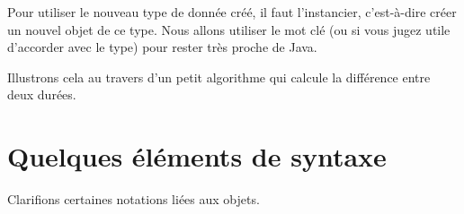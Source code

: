 		Pour utiliser le nouveau type de donnée créé,
		il faut l'instancier, c'est-à-dire créer un nouvel objet de ce type.
		Nous allons utiliser le mot clé 
		(ou  si vous jugez utile d'accorder avec le type)
		pour rester très proche de Java.
		
		Illustrons cela au travers d'un petit algorithme
		qui calcule la différence entre deux durées.
		
		\begin{algo}
		\end{algo}

\section{Quelques éléments de syntaxe}

	Clarifions certaines notations liées aux objets.

